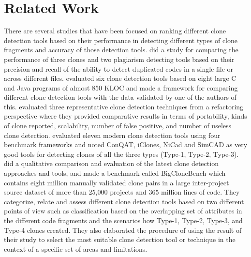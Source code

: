 \documentclass[review]{elsarticle}
\begin{document}
\section{Related Work}
\label{the-related-works}
There are several studies \citep{jeff-evaluating, Roy09comparisonand, 4288192Comparison, ScenarioBasedComparison} that have been focused on ranking different clone detection tools based on their performance in detecting different types of clone fragments and accuracy of those detection tools. \citet{BaileyBurdComparison} did a study for comparing the performance of three clones and two plagiarism detecting tools based on their precision and recall of the ability to detect duplicated codes in a single file or across different files.  \citet{4288192Comparison} evaluated six clone detection tools based on eight large C and Java programs of almost 850 KLOC and made a framework for comparing different clone detection tools with the data validated by one of the authors of this.  \citet{EvaluateRefactoring} evaluated three representative clone detection techniques from a refactoring perspective where they provided comparative results in terms of portability, kinds of clone reported, scalability, number of false positive, and number of useless clone detection.   \citet{jeff-evaluating} evaluated eleven modern clone detection tools using four benchmark frameworks and noted ConQAT, iClones, NiCad and SimCAD as very good tools for detecting clones of all the three types (Type-1, Type-2, Type-3). \citet{Roy09comparisonand} did a qualitative comparison and evaluation of the latest clone detection approaches and tools, and made a benchmark called BigCloneBench \citep{BigCloneBenchCKRoyJRCordy} which contains eight million manually validated clone pairs in a large inter-project source dataset of more than 25,000 projects and 365 million lines of code. They categorize, relate and assess different clone detection tools based on two different points of view such as classification based on the overlapping set of attributes in the different code fragments and the scenarios how Type-1, Type-2, Type-3, and Type-4 clones created. They also elaborated the procedure of using the result of their study to select the most suitable clone detection tool or technique in the context of a specific set of areas and limitations. \\
\end{document}
